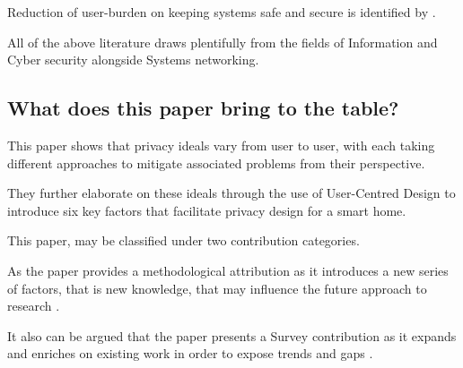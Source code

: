 Reduction of user-burden on keeping systems safe and secure is identified by \textcite{23}.

All of the above literature draws plentifully from the fields of Information and Cyber security alongside Systems networking.

\subsection{What does this paper bring to the table?}

This paper shows that privacy ideals vary from user to user, with each taking different approaches to mitigate associated problems from their perspective. 

They further elaborate on these ideals through the use of User-Centred Design to introduce six key factors that facilitate privacy design for a smart home.

This paper, may be classified under two contribution categories.

As the paper provides a methodological attribution as it introduces a new series of factors, that is new knowledge, that may influence the future approach to research \parencite{acmMethods}.

It also can be argued that the paper presents a Survey contribution as it expands and enriches on existing work in order to expose trends and gaps \parencite{acmMethods}.
